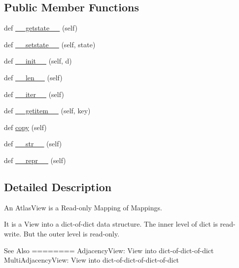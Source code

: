 \subsection*{Public Member Functions}
\begin{DoxyCompactItemize}
\item 
def \hyperlink{classnetworkx_1_1classes_1_1coreviews_1_1AtlasView_a009a82868160c1daa7ddf70c5cc23ed5}{\+\_\+\+\_\+getstate\+\_\+\+\_\+} (self)
\item 
def \hyperlink{classnetworkx_1_1classes_1_1coreviews_1_1AtlasView_a184d078b73604c6bef55037e0f3dcf45}{\+\_\+\+\_\+setstate\+\_\+\+\_\+} (self, state)
\item 
def \hyperlink{classnetworkx_1_1classes_1_1coreviews_1_1AtlasView_a297cc253811b740b3543b373a368b058}{\+\_\+\+\_\+init\+\_\+\+\_\+} (self, d)
\item 
def \hyperlink{classnetworkx_1_1classes_1_1coreviews_1_1AtlasView_ab8c3a3db7fe4d0033ee161c6de9fa6df}{\+\_\+\+\_\+len\+\_\+\+\_\+} (self)
\item 
def \hyperlink{classnetworkx_1_1classes_1_1coreviews_1_1AtlasView_a0333113ef8ed83afa6a0db188e4cb3e9}{\+\_\+\+\_\+iter\+\_\+\+\_\+} (self)
\item 
def \hyperlink{classnetworkx_1_1classes_1_1coreviews_1_1AtlasView_aa6283ef409febaa61b6507fa4e6c50d1}{\+\_\+\+\_\+getitem\+\_\+\+\_\+} (self, key)
\item 
def \hyperlink{classnetworkx_1_1classes_1_1coreviews_1_1AtlasView_ab1700e7f08e64ad633f2ac9e90bc2f95}{copy} (self)
\item 
def \hyperlink{classnetworkx_1_1classes_1_1coreviews_1_1AtlasView_abadd2c51672379798a83addd9ee3c100}{\+\_\+\+\_\+str\+\_\+\+\_\+} (self)
\item 
def \hyperlink{classnetworkx_1_1classes_1_1coreviews_1_1AtlasView_a417cf4c79f7df86bbde8ac3eebab9ab7}{\+\_\+\+\_\+repr\+\_\+\+\_\+} (self)
\end{DoxyCompactItemize}


\subsection{Detailed Description}
\begin{DoxyVerb}An AtlasView is a Read-only Mapping of Mappings.

It is a View into a dict-of-dict data structure.
The inner level of dict is read-write. But the
outer level is read-only.

See Also
========
AdjacencyView: View into dict-of-dict-of-dict
MultiAdjacencyView: View into dict-of-dict-of-dict-of-dict
\end{DoxyVerb}
 

